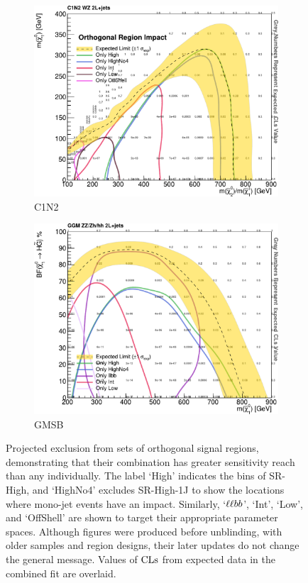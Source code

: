 \begin{figure}[tp]
\centering
\begin{subfigure}{0.48\textwidth}
\centering
\includegraphics[width=\textwidth]{figures/2ljets_fit_multi_contours_c1n2.pdf}
\caption{C1N2}
\end{subfigure}
\hfill
\begin{subfigure}{0.48\textwidth}
\centering
\includegraphics[width=\textwidth]{figures/2ljets_fit_multi_contours_gmsb.pdf}
\caption{GMSB}
\end{subfigure}
\caption[
Projected exclusion from sets of orthogonal signal regions
]{%
Projected exclusion from sets of orthogonal signal regions, demonstrating that
their combination has greater sensitivity reach than any individually.
The label `High' indicates the bins of SR-High, and `HighNo4' excludes
SR-High-1J to show the locations where mono-jet events have an impact.
Similarly, `$\ell\ell bb$', `Int', `Low', and `OffShell' are shown to target their
appropriate parameter spaces.
Although figures were produced before unblinding, with older samples and region
designs, their later updates do not change the general message.
Values of $\mathrm{CLs}$ from expected data in the combined fit are overlaid.
}
\label{fig:2ljets_fit_multi_contours}
\end{figure}

